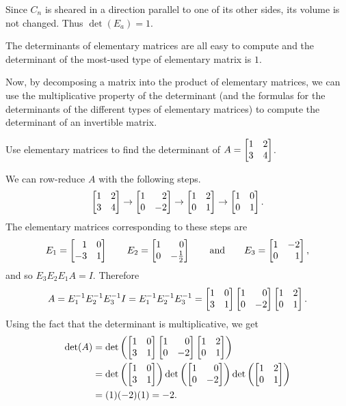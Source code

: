 Since $C_n$ is sheared in a direction parallel to one of its other sides, its volume is not changed. Thus $\det(E_a)=1$.

\begin{emphbox}[Takeaway]
	The determinants of elementary matrices are all easy to compute and the determinant of the
	most-used type of elementary matrix is $1$.
\end{emphbox}

Now, by decomposing a matrix into the product of elementary matrices, 
we can use the multiplicative property of the determinant (and the formulas for the determinants
of the different types of elementary matrices) to compute the determinant of an invertible
matrix.

\begin{example}
	Use elementary matrices to find the determinant of $A=\mat{1&2\\3&4}$.

	We can row-reduce $A$ with the following steps.
	\[
	    \mat{1&2\\3&4}\to \mat{1&2\\0&-2}\to \mat{1&2\\0&1}\to \mat{1&0\\0&1}.
	\]
	The elementary matrices corresponding to these steps are
	\[
		E_1=\mat{1&0\\-3&1} \qquad E_2=\mat{1&0\\0&-\frac{1}{2}}\qquad\text{and}\qquad E_3=\mat{1&-2\\0&1}, 
	\]
	and so $E_3 E_2 E_1 A = I$. Therefore
	\[
	    A=E_1^{-1}E_2^{-1}E_3^{-1}I=E_1^{-1}E_2^{-1}E_3^{-1}=
	    \mat{1&0\\3&1}\mat{1&0\\0&-2}\mat{1&2\\0&1}.
	\]
	Using the fact that the determinant is multiplicative, we get
	\begin{align*}
	    \det(A)&=\det\left(\mat{1&0\\3&1}\mat{1&0\\0&-2}\mat{1&2\\0&1}\right)\\
	           &=\det\left(\mat{1&0\\3&1}\right)\det\left(\mat{1&0\\0&-2}\right)\det\left(\mat{1&2\\0&1}\right)\\
		   &=(1)(-2)(1) = -2.
	\end{align*}
\end{example}

